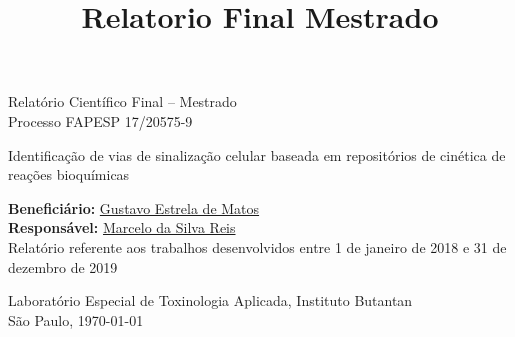 \documentclass[12pt]{article}
\title{Relatorio Final Mestrado}
\begin{document}
%
\doublespacing

\begin{titlepage}
    \vfill 
    \begin{center}
        {\Large Relatório Científico Final -- Mestrado\\
         \bigskip
         Processo FAPESP 17/20575-9
        }
        
        \bigskip
        \bigskip
    
        {\LARGE Identificação de vias de sinalização celular baseada em
        repositórios de cinética de reações bioquímicas}

        \bigskip
        \bigskip
        {\Large {\bf Beneficiário:}
        \href{mailto:gustavo.estrela.matos@usp.br}{Gustavo Estrela de
        Matos}\\ 
        
        {\bf Responsável:}
        \href{mailto:marcelo.reis@butantan.gov.br}{Marcelo da Silva
        Reis}\\

        \bigskip
        \bigskip
        \bigskip
        \bigskip
        \bigskip
        \bigskip
        \bigskip
        Relatório referente aos trabalhos desenvolvidos entre 1 de
        janeiro de 2018 e 31 de dezembro de 2019

        \bigskip
        \bigskip
        \bigskip
        \bigskip
        \bigskip
        \bigskip
        \bigskip

        Laboratório Especial de Toxinologia Aplicada, Instituto
        Butantan\\
        \bigskip
        São Paulo, \today\\
        }

        \bigskip
        \bigskip

       

\end{center}
\end{titlepage}


\tableofcontents

\pagebreak
\end{document}
